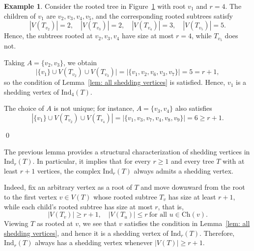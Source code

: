 \documentclass[12pt,reqno]{amsart}
\theoremstyle{definition}
\newtheorem{example}[theorem]{Example}
\def\Ind{\mathrm{Ind}}
\def\Ch{\mathrm{Ch}}
\begin{document}
\begin{figure}[H]
\centering
{}
\caption{}
\label{fig:tree13}
\end{figure}

\begin{example}\label{ex: shedding vertex}
Consider the rooted tree in Figure~\ref{fig:tree13} with root $v_1$ and $r=4$. The children of $v_1$ are
$v_2,v_3,v_4,v_5$, and the corresponding rooted subtrees satisfy
\[
|V(T_{v_2})|=2,\quad |V(T_{v_3})|=2,\quad |V(T_{v_4})|=3,\quad |V(T_{v_5})|=5.
\]
Hence, the subtrees rooted at $v_2,v_3,v_4$ have size at most $r=4$, while $T_{v_5}$ does not.

Taking $A=\{v_2,v_3\}$, we obtain
\[
\Big|\{v_1\}\cup V(T_{v_2})\cup V(T_{v_3})\Big|
= |\{v_1,v_2,v_6,v_3,v_7\}| = 5 = r+1,
\]
so the condition of Lemma~\ref{lem: all shedding vertices} is satisfied. Hence, $v_1$ is a shedding vertex of $\Ind_4(T)$.

The choice of $A$ is not unique; for instance, $A=\{v_3,v_4\}$ also satisfies
\[
|\{v_1\}\cup V(T_{v_2})\cup V(T_{v_4})|
= |\{v_1,v_3,v_7,v_4,v_8,v_9\}| = 6 \ge r+1.
\]


\qed
\end{example}


The previous lemma provides a structural characterization of shedding vertices in $\Ind_r(T)$. In particular, it implies that for every $r \ge 1$ and every tree $T$ with at least $r+1$ vertices, the complex $\Ind_r(T)$ always admits a shedding vertex.

Indeed, fix an arbitrary vertex as a root of $T$ and move downward from the root to the first vertex $v \in V(T)$ whose rooted subtree $T_v$ has size at least $r+1$, while each child’s rooted subtree has size at most $r$, that is,
\[
|V(T_v)| \ge r+1, \quad |V(T_u)| \le r \ \text{for all } u \in \Ch(v).
\]
Viewing $T$ as rooted at $v$, we see that $v$ satisfies the condition in Lemma~\ref{lem: all shedding vertices}, and hence it is a shedding vertex of $\Ind_r(T)$. Therefore, $\Ind_r(T)$ always has a shedding vertex whenever $|V(T)| \ge r+1$.
\end{document}
